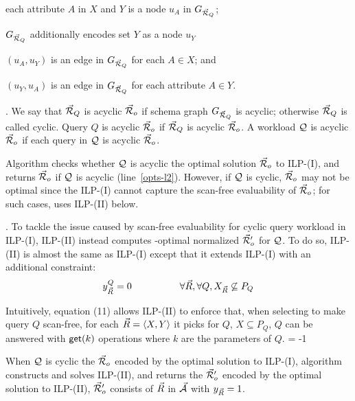 {\bi
\item each attribute $A$ in $X$ and $Y$ is a node $u_{A}$ in $G_{\vec{{\mathcal R}}_{Q}}$;
\item $G_{\vec{{\mathcal R}}_{Q}}$ additionally encodes set $Y$ as a node $u_{Y}$
\item $(u_{A}, u_{Y})$ is an edge in $G_{\vec{{\mathcal R}}_{Q}}$ for each $A\in X$; and
\item $(u_{Y}, u_{A})$ is an edge in $G_{\vec{{\mathcal R}}_{Q}}$ for each attribute $A\in Y$.
\ei 


\begin{example}\label{exa-schemagraph}
\end{example}


.
We say that $\vec{{\mathcal R}}_{Q}$ is acyclic \wrt $\vec{{\mathcal R}}_{o}$ if schema
graph $G_{\vec{{\mathcal R}}_{Q}}$ is acyclic; otherwise $\vec{{\mathcal R}}_{Q}$ is
called cyclic. Query $Q$ is acyclic \wrt $\vec{{\mathcal R}}_{o}$ if
$\vec{{\mathcal R}}_{Q}$ is acyclic \wrt $\vec{{\mathcal R}}_{o}$. A workload $\mathcal Q$ is
acyclic \wrt $\vec{{\mathcal R}}_{o}$ if each query in $\mathcal Q$ is acyclic \wrt
$\vec{{\mathcal R}}_{o}$.


\vspace{0.8ex}
Algorithm \opts checks whether $\mathcal Q$ is acyclic \wrt the optimal
solution $\vec{{\mathcal R}}_{o}$ to ILP-(I), and returns $\vec{{\mathcal R}}_{o}$ 
if $\mathcal Q$ is acyclic (line~\ref{opts-l2}). However, if $\mathcal Q$ is
cyclic, $\vec{{\mathcal R}}_{o}$ may not be optimal since the ILP-(I) cannot
capture the scan-free evaluability of $\vec{{\mathcal R}}_{o}$;
for such cases, \opts uses ILP-(II) below.



.
To tackle the issue caused by scan-free evaluability for cyclic
query workload in ILP-(I), ILP-(II) instead computes %
\ssf-optimal normalized \bds $\vec{{\mathcal R}}_{o}'$ for $\mathcal Q$. 
To do so, ILP-(II) is almost the same as ILP-(I) except that it
extends ILP-(I) with an additional constraint:
\begin{alignat}{2}                                                       
&  y_{\vec{R}}^{Q} = 0 &~~~~~~~~~~~~\forall \vec{R}, \forall Q, X_{\vec{R}}\not\subseteq P_{Q}
\end{alignat}                                                            

Intuitively, equation (11) allows ILP-(II) to enforce that, when
selecting \bss to make query $Q$ scan-free, for each
\bs $\vec{R} \allowbreak = \allowbreak \langle X,\allowbreak Y\rangle$ it picks for $Q$, $X\subseteq
P_{Q}$, \ie $Q$ can be answered with $\protect\mathsf{get}(k)$ operations where
$k$ are the parameters of $Q$. 
\looseness = -1


\vspace{0.8ex}
When $\mathcal Q$ is cyclic \wrt the \bds $\vec{{\mathcal R}}_{o}$ encoded by the
optimal solution to ILP-(I), algorithm \opts constructs and solves
ILP-(II), and returns the \bds $\vec{{\mathcal R}}_{o}'$ encoded by the
optimal solution to ILP-(II), \ie $\vec{{\mathcal R}}_{o}'$ consists of \bss
$\vec{R}$ in $\vec{{\mathcal A}}$ with $y_{\vec{R}} = 1$. 

}
